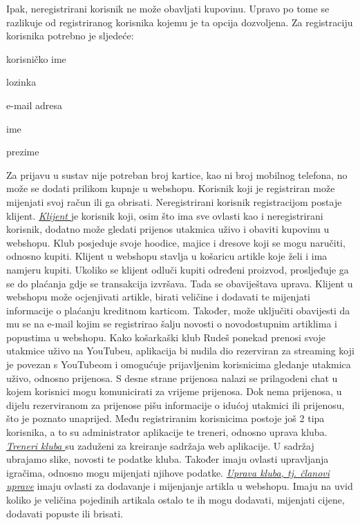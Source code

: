 \textnormal{Ipak, neregistrirani korisnik ne može obavljati kupovinu. Upravo po tome se razlikuje od registriranog korisnika kojemu je ta opcija dozvoljena.}
\textnormal{Za registraciju korisnika potrebno je sljedeće:}
\begin{packed_item}
	\item korisničko ime
	\item lozinka
	\item e-mail adresa
	\item ime
	\item prezime
\end{packed_item}
\textnormal{ Za prijavu u sustav nije potreban broj kartice, kao ni broj mobilnog telefona, no može se dodati prilikom kupnje u webshopu. Korisnik
	koji je registriran može mijenjati svoj račun ili ga obrisati. Neregistrirani korisnik registracijom postaje klijent.}
\bigbreak
\underline{\textit{Klijent} }\textnormal {je korisnik koji, osim što ima sve ovlasti kao i neregistrirani korisnik, dodatno može gledati prijenos utakmica uživo i obaviti kupovinu u webshopu.
	Klub posjeduje svoje hoodice, majice i dresove koji se mogu naručiti, odnosno kupiti. Klijent u webshopu stavlja u košaricu artikle koje 
	želi i ima namjeru kupiti. Ukoliko se klijent odluči kupiti određeni proizvod, prosljeđuje ga se do plaćanja gdje se transakcija izvršava.
	Tada se obaviještava uprava.
	Klijent u webshopu može ocjenjivati artikle, birati veličine i dodavati te mijenjati informacije o plaćanju kreditnom karticom. Također, može uključiti obavijesti da mu se na e-mail kojim se registrirao šalju novosti o novodostupnim artiklima i popustima u webshopu. Kako košarkaški klub Rudeš ponekad prenosi svoje utakmice uživo na YouTubeu, aplikacija bi nudila dio rezerviran za streaming koji
	je povezan s YouTubeom i omogućuje prijavljenim korisnicima gledanje utakmica uživo, odnosno prijenosa. S desne strane prijenosa 
	nalazi se prilagodeni chat u kojem korisnici mogu komunicirati za vrijeme prijenosa. Dok nema prijenosa, u dijelu rezerviranom za 
	prijenose pišu informacije o idućoj utakmici ili prijenosu, što je poznato unaprijed.}
\bigbreak
\textnormal {Među registriranim korisnicima postoje još 2 tipa korisnika, a to su administrator aplikacije te treneri, odnosno uprava kluba.}
\bigbreak
\underline{\textit{Treneri kluba} }\textnormal {su zaduženi za kreiranje sadržaja web aplikacije. U sadržaj ubrajamo slike, novosti te podatke kluba.  Također imaju ovlasti upravljanja igračima, odnosno mogu mijenjati njihove podatke.}
\bigbreak
\underline{\textit{Uprava kluba, tj. članovi uprave}} \textnormal {imaju ovlasti za dodavanje i mijenjanje artikla u webshopu. Imaju na uvid koliko je veličina pojedinih artikala ostalo te ih mogu dodavati, mijenjati cijene, dodavati popuste ili brisati.}
